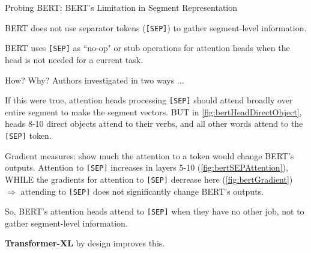 \begin{frame}{Probing BERT: BERT's Limitation in Segment Representation}
    \normalsize
    \linespread{0.4}
    
    \begin{itemizeSpaced}{10pt}
        \item BERT does not use separator tokens (\texttt{[SEP]}) to gather segment-level information. 
        
        \pinkbox BERT uses \texttt{[SEP]} as ``no-op" or stub operations for attention heads when the head is not needed for a current task. 
        
        \item How? Why? Authors investigated in two ways ...
        
        \begin{itemizeSpaced}{10pt}
        
        \normalsize \linespread{0.4}
        
            \item If this were true, attention heads processing \texttt{[SEP]} should attend broadly over entire segment to make the segment vectors. BUT in \cref{fig:bertHeadDirectObject}, heads 8-10 direct objects attend to their verbs, and all other words attend to the \texttt{[SEP]} token. 
            
            \item Gradient measures: show much the attention to a token would change BERT's outputs. Attention to \texttt{[SEP]} increases in layers 5-10 (\cref{fig:bertSEPAttention}), WHILE the gradients for attention to \texttt{[SEP]} decrease here (\cref{fig:bertGradient})  $\Rightarrow$ attending to \texttt{[SEP]} does not significantly change BERT's outputs. 
        \end{itemizeSpaced}
    \end{itemizeSpaced}
    


So, BERT's attention heads attend to \texttt{[SEP]} when they have no other job, not to gather segment-level information. 

\textbf{Transformer-XL} by design improves this.

\end{frame}





